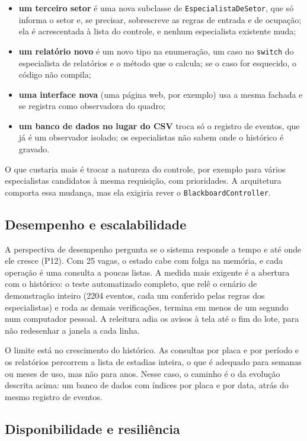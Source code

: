 \begin{itemize}
  \item \textbf{um terceiro setor} é uma nova subclasse de \texttt{EspecialistaDeSetor}, que só informa o setor e, se precisar, sobrescreve as regras de entrada e de ocupação; ela é acrescentada à lista do controle, e nenhum especialista existente muda;
  \item \textbf{um relatório novo} é um novo tipo na enumeração, um caso no \texttt{switch} do especialista de relatórios e o método que o calcula; se o caso for esquecido, o código não compila;
  \item \textbf{uma interface nova} (uma página web, por exemplo) usa a mesma fachada e se registra como observadora do quadro;
  \item \textbf{um banco de dados no lugar do CSV} troca só o registro de eventos, que já é um observador isolado; os especialistas não sabem onde o histórico é gravado.
\end{itemize}

O que custaria mais é trocar a natureza do controle, por exemplo para vários especialistas candidatos à mesma requisição, com prioridades. A arquitetura comporta essa mudança, mas ela exigiria rever o \texttt{BlackboardController}.

\subsection{Desempenho e escalabilidade}

A perspectiva de desempenho pergunta se o sistema responde a tempo e até onde ele cresce (P12). Com 25 vagas, o estado cabe com folga na memória, e cada operação é uma consulta a poucas listas. A medida mais exigente é a abertura com o histórico: o teste automatizado completo, que relê o cenário de demonstração inteiro (2204 eventos, cada um conferido pelas regras dos especialistas) e roda as demais verificações, termina em menos de um segundo num computador pessoal. A releitura adia os avisos à tela até o fim do lote, para não redesenhar a janela a cada linha.

O limite está no crescimento do histórico. As consultas por placa e por período e os relatórios percorrem a lista de estadias inteira, o que é adequado para semanas ou meses de uso, mas não para anos. Nesse caso, o caminho é o da evolução descrita acima: um banco de dados com índices por placa e por data, atrás do mesmo registro de eventos.

\subsection{Disponibilidade e resiliência}

